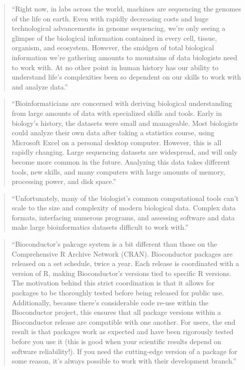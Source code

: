 \documentclass[]{tufte-book}
\begin{document}
\begin{quote}
``Right now, in labs across the world, machines are sequencing the genomes of the life
on earth. Even with rapidly decreasing costs and huge technological advancements in
genome sequencing, we're only seeing a glimpse of the biological information contained
in every cell, tissue, organism, and ecosystem. However, the smidgen of total biological
information we're gathering amounts to mountains of data biologists need to work with. At
no other point in human history has our ability to understand life's complexities been so
dependent on our skills to work with and analyze data.'' \citep{buffalo2015bioinformatics}
\end{quote}

\begin{quote}
``Bioinformaticians are concerned with deriving biological understanding from large
amounts of data with specialized skills and tools. Early in biology's history, the
datasets were small and manageable. Most biologists could analyze their own data after
taking a statistics course, using Microsoft Excel on a personal desktop computer.
However, this is all rapidly changing. Large sequencing datasets are widespread, and will
only become more common in the future. Analyzing this data takes different tools, new skills,
and many computers with large amounts of memory, processing power, and disk space.''
\citep{buffalo2015bioinformatics}
\end{quote}

\begin{quote}
``Unfortunately, many of the biologist's common computational tools can't scale to the
size and complexity of modern biological data. Complex data formats, interfacing
numerous programs, and assessing software and data make large bioinformatics datasets
difficult to work with.'' \citep{buffalo2015bioinformatics}
\end{quote}

\begin{quote}
``Bioconductor's pakcage system is a bit different than those on the Comprehensive R
Archive Network (CRAN). Bioconductor packages are released on a set schedule, twice
a year. Each release is coordinated with a version of R, making Bioconductor's versions
tied to specific R versions. The motivation behind this strict coordination is that it
allows for packages to be thoroughly tested before being released for public use.
Additionally, because there's considerable code re-use within the Bioconductor project,
this ensures that all package versions within a Bioconductor release are compatible
with one another. For users, the end result is that packages work as expected and
have been rigorously tested before you use it (this is good when your scientific
results depend on software reliability!). If you need the cutting-edge version of a
package for some reason, it's always possible to work with their development branch.''
\citep{buffalo2015bioinformatics}
\end{quote}
\end{document}
